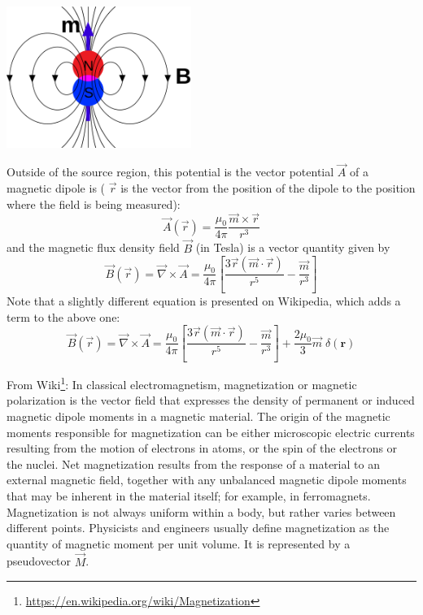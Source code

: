


\begin{center}
\includegraphics[width=6cm]{python_codes/fieldstone_138/images/Magnetic_field_due_to_dipole_moment.png}
\end{center}

Outside of the source region, this potential is the vector potential $\vec A$ of a magnetic dipole is (
$\vec r$ is the vector from the position of the dipole to the position where the field is being measured):
\[
\vec A(\vec r) = \frac{\mu_0}{4 \pi} \frac{\vec m \times \vec r}{r^3}
\]
and the magnetic flux density field $\vec B$ (in Tesla) is a vector quantity given by
\[
\vec B (\vec r) = \vec \nabla \times \vec A 
=
\frac{\mu_0}{4\pi} \left[  \frac{3 \vec r (\vec m \cdot \vec r)}{r^5} - \frac{\vec m}{r^3}  \right]
\]
Note that a slightly different equation is presented on Wikipedia, which adds a term to the above one:
\[
\vec B (\vec r) = \vec \nabla \times \vec A 
=
\frac{\mu_0}{4\pi} \left[  \frac{3 \vec r (\vec m \cdot \vec r)}{r^5} - \frac{\vec m}{r^3}  \right]
+ \frac{2\mu_0}{3} \vec m \; \delta(\bm r)
\]

From Wiki\footnote{\url{https://en.wikipedia.org/wiki/Magnetization}}: In classical electromagnetism, magnetization or magnetic polarization is the vector field that expresses the density of permanent or induced magnetic dipole moments in a magnetic material. The origin of the magnetic moments responsible for magnetization can be either microscopic electric currents resulting from the motion of electrons in atoms, or the spin of the electrons or the nuclei. Net magnetization results from the response of a material to an external magnetic field, together with any unbalanced magnetic dipole moments that may be inherent in the material itself; for example, in ferromagnets. Magnetization is not always uniform within a body, but rather varies between different points. 
Physicists and engineers usually define magnetization as the quantity of magnetic moment per unit volume. It is represented by a pseudovector $\vec M$.

